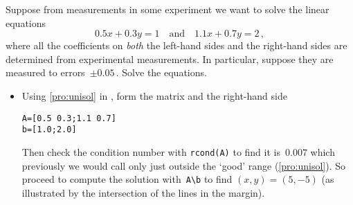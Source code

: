 \begin{example} \label{eg:2regu}
Suppose from measurements in some experiment we want to solve the linear equations
\begin{equation*}
0.5x+0.3y=1\quad\text{and}\quad 1.1x+0.7y=2\,,
\end{equation*}
where all the coefficients on \emph{both} the left-hand sides and the right-hand sides are determined from experimental measurements.
In particular, suppose they are measured to errors~\(\pm0.05\)\,.
Solve the equations.
\begin{solution} 
\begin{itemize}
\item Using \autoref{pro:unisol} in \script, form the matrix and the right-hand side
\begin{verbatim}
A=[0.5 0.3;1.1 0.7]
b=[1.0;2.0]
\end{verbatim}
Then check the condition number with \verb|rcond(A)| to find it is~\(0.007\) which previously we would call only just outside the `good' range (\autoref{pro:unisol}).
%
So proceed to compute the solution with~\verb|A\b| to find \((x,y)=(5,-5)\) (as illustrated by the intersection of the lines in the margin).


\end{itemize}
\end{solution}
\end{example}
